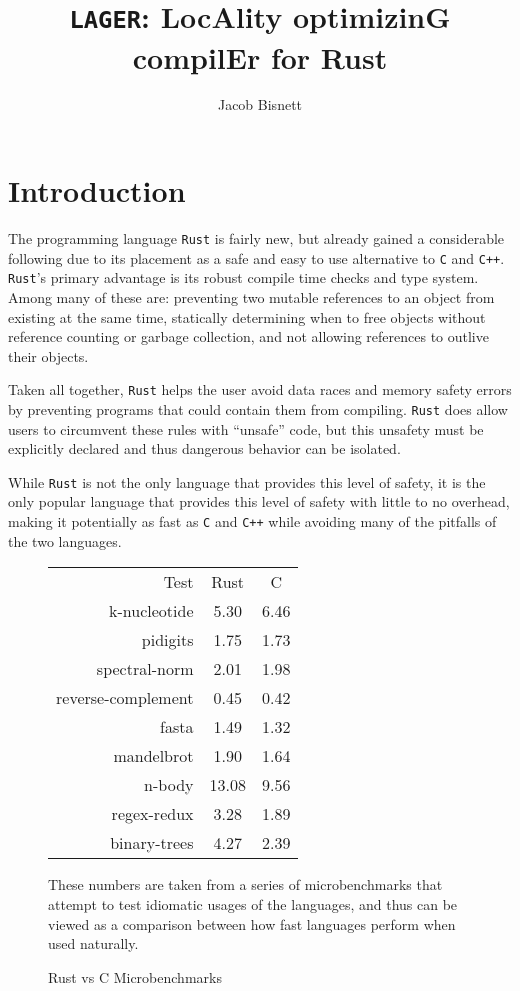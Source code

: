 \documentclass[12pt,oneside]{book}
\newcommand{\rustname}{{\texttt{Rust}}}
\def \rust {\rustname{}\xspace}
\newcommand{\cname}{{\texttt{C}}}
\def \c {\cname{}\xspace}
\newcommand{\cppname}{{\texttt{C++}}}
\def \cpp {\cppname{}\xspace}
\newcommand{\projectname}{{\texttt{LAGER}}}
\def \name{\projectname\xspace}
\begin{document}
\title{\name: LocAlity optimizinG compilEr for Rust}
\author{Jacob Bisnett}
\maketitle
\pagestyle{fancy}
\chapter{Introduction}
\doublespacing
\label{sec:intro}


The programming language \rust is fairly new, but already gained a considerable
following due to its placement as a safe and easy to use alternative to \c and
\cpp. \rust's primary advantage is its robust compile time checks and type
system. Among many of these are:
preventing two mutable references to an object from existing at the same time, 
statically determining when to free objects without reference counting or
garbage collection,
and not allowing references to outlive their objects.

Taken all together, \rust helps the user avoid data races and memory safety
errors by preventing programs that could contain them from compiling.
\rust does allow users to circumvent these rules with ``unsafe'' code,
but this unsafety must be explicitly declared and thus dangerous behavior can be
isolated.

While \rust is not the only language that provides this level of safety, it is
the only popular language that provides this level of safety with little to no overhead,
making it potentially as fast as \c and \cpp while avoiding many of the
pitfalls of the two languages.

\begin{figure}
  \centering
\begin{tabular}{r|c|c}
  Test&Rust&C\\
  k-nucleotide&5.30&6.46\\
  pidigits&1.75&1.73\\
  spectral-norm&2.01&1.98\\
  reverse-complement&0.45&0.42\\
  fasta&1.49&1.32\\
  mandelbrot&1.90&1.64\\
  n-body&13.08&9.56\\
  regex-redux&3.28&1.89\\
  binary-trees&4.27&2.39\\
\end{tabular}

  These numbers are taken from a series of microbenchmarks that attempt to 
  test idiomatic usages of the languages, and thus can be viewed as a comparison
  between how fast languages perform when used naturally.\cite{bench}
  \caption{Rust vs C Microbenchmarks}
  \label{fig:bench}
\end{figure}
\end{document}
